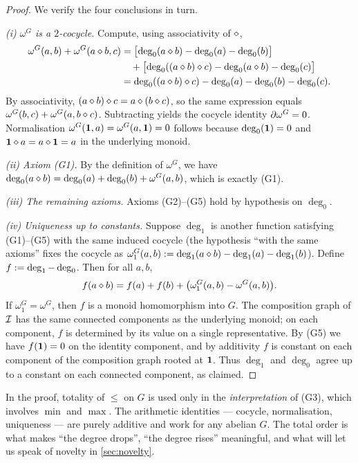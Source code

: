 \begin{proof}
We verify the four conclusions in turn.

\emph{(i) $\omega^G$ is a $2$-cocycle.} Compute, using associativity of
$\mathbin{\diamond}$,
\begin{align*}
  \omega^G(a,b) + \omega^G(a\mathbin{\diamond} b, c)
  &= \bigl[\deg_0(a\mathbin{\diamond} b) - \deg_0(a) - \deg_0(b)\bigr] \\
  &\quad{} + \bigl[\deg_0((a\mathbin{\diamond} b)\mathbin{\diamond} c) - \deg_0(a\mathbin{\diamond} b)
            - \deg_0(c)\bigr] \\
  &= \deg_0((a\mathbin{\diamond} b)\mathbin{\diamond} c) - \deg_0(a) - \deg_0(b) - \deg_0(c).
\end{align*}
By associativity, $(a\mathbin{\diamond} b)\mathbin{\diamond} c = a\mathbin{\diamond}(b\mathbin{\diamond} c)$, so
the same expression equals $\omega^G(b,c) + \omega^G(a,b\mathbin{\diamond} c)$.
Subtracting yields the cocycle identity $\partial \omega^G = 0$.
Normalisation $\omega^G(\mathbf{1},a) = \omega^G(a,\mathbf{1}) = 0$ follows
because $\deg_0(\mathbf{1}) = 0$ and $\mathbf{1}\mathbin{\diamond} a = a\mathbin{\diamond} \mathbf{1} = a$
in the underlying monoid.

\emph{(ii) Axiom (G1).} By the definition of $\omega^G$, we have
$\deg_0(a\mathbin{\diamond} b) = \deg_0(a) + \deg_0(b) + \omega^G(a,b)$, which is
exactly (G1).

\emph{(iii) The remaining axioms.} Axioms (G2)--(G5) hold by
hypothesis on $\deg_0$.

\emph{(iv) Uniqueness up to constants.} Suppose $\deg_1$ is another
function satisfying (G1)--(G5) with the same induced cocycle (the
hypothesis ``with the same axioms'' fixes the cocycle as
$\omega^G_1(a,b) \mathrel{:=} \deg_1(a\mathbin{\diamond} b) - \deg_1(a) - \deg_1(b)$).
Define $f \mathrel{:=} \deg_1 - \deg_0$. Then for all $a,b$,
\[
  f(a\mathbin{\diamond} b) = f(a) + f(b) + \bigl(\omega^G_1(a,b) - \omega^G(a,b)\bigr).
\]
If $\omega^G_1 = \omega^G$, then $f$ is a monoid homomorphism into
$G$. The composition graph of $\mathcal{I}$ has the same connected components
as the underlying monoid; on each component, $f$ is determined by its
value on a single representative. By (G5) we have $f(\mathbf{1}) = 0$ on the
identity component, and by additivity $f$ is constant on each component
of the composition graph rooted at $\mathbf{1}$. Thus $\deg_1$ and $\deg_0$
agree up to a constant on each connected component, as claimed.
\end{proof}

\begin{remark}
In the proof, totality of $\le$ on $G$ is used only in the
\emph{interpretation} of (G3), which involves $\min$ and $\max$. The
arithmetic identities --- cocycle, normalisation, uniqueness --- are
purely additive and work for any abelian $G$. The total order is what
makes ``the degree drops'', ``the degree rises'' meaningful, and what
will let us speak of novelty in \cref{sec:novelty}.
\end{remark}

